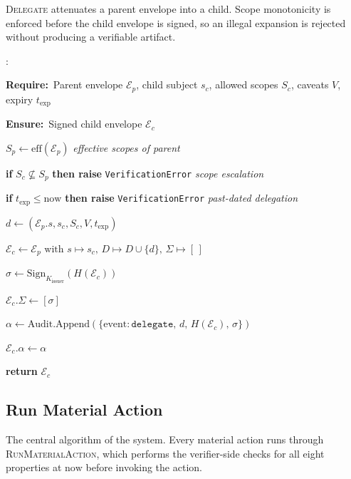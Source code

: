 \documentclass[11pt,a4paper]{article}
\newcommand{\AlgKwd}[1]{\textbf{#1}}
\newcommand{\Require}{\AlgKwd{Require:}~}
\newcommand{\Ensure}{\AlgKwd{Ensure:}~}
\newcommand{\Comment}[1]{\hfill\textit{\small#1}}
\newenvironment{algorithmic}
  {\begin{framed}\small\begin{list}{\arabic{enumi}:}{%
      \usecounter{enumi}\setlength{\itemsep}{0pt}\setlength{\parsep}{0pt}%
      \setlength{\leftmargin}{2.2em}\setlength{\labelwidth}{1.8em}}}
  {\end{list}\end{framed}}
\begin{document}
\textsc{Delegate} attenuates a parent envelope into a child. Scope
monotonicity is enforced before the child envelope is signed, so an
illegal expansion is rejected without producing a verifiable artifact.

\begin{algo}
\caption{\textsc{Delegate}($\mathcal{E}_p, s_c, S_c, V, t_\text{exp}$)}\label{alg:delegate}
\begin{algorithmic}
\item \Require Parent envelope $\mathcal{E}_p$, child subject $s_c$, allowed scopes $S_c$, caveats $V$, expiry $t_\text{exp}$
\item \Ensure Signed child envelope $\mathcal{E}_c$
\item $S_p \gets \text{eff}(\mathcal{E}_p)$ \Comment{effective scopes of parent}
\item \textbf{if} $S_c \not\subseteq S_p$ \textbf{then raise} \texttt{VerificationError} \Comment{scope escalation}
\item \textbf{if} $t_\text{exp} \leq \mathrm{now}$ \textbf{then raise} \texttt{VerificationError} \Comment{past-dated delegation}
\item $d \gets (\mathcal{E}_p.s, s_c, S_c, V, t_\text{exp})$
\item $\mathcal{E}_c \gets \mathcal{E}_p \text{ with } s \mapsto s_c,\, D \mapsto D \cup \{d\},\, \Sigma \mapsto [\,]$
\item $\sigma \gets \mathrm{Sign}_{K_\text{issuer}}(H(\mathcal{E}_c))$
\item $\mathcal{E}_c.\Sigma \gets [\sigma]$
\item $\alpha \gets \mathrm{Audit.Append}(\{\text{event}: \texttt{delegate},\, d,\, H(\mathcal{E}_c),\, \sigma\})$
\item $\mathcal{E}_c.\alpha \gets \alpha$
\item \textbf{return} $\mathcal{E}_c$
\end{algorithmic}
\end{algo}

\subsection{Run Material Action}\label{sec:run-action}

The central algorithm of the system. Every material action runs through
\textsc{RunMaterialAction}, which performs the verifier-side checks for
all eight properties at $\mathrm{now}$ before invoking the action.
\end{document}

